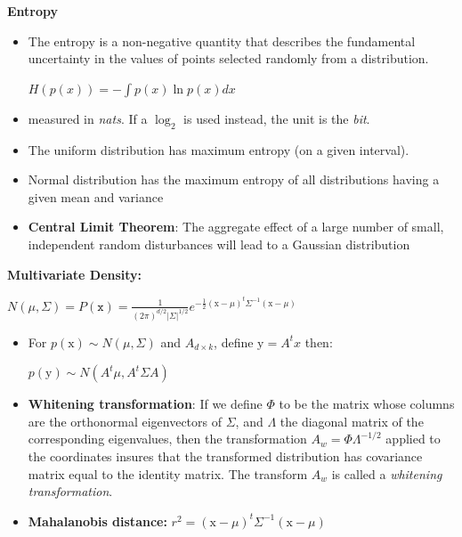 \documentclass{../cheat}
\begin{document}
\begin{multicols}{3}
	\textbf{Entropy}
	\begin{itemize}[nolistsep, leftmargin=1em]
		\item The entropy is a non-negative quantity that describes the fundamental uncertainty in the values of points selected randomly from a distribution.\\
			\centerline{$H(p(x)) = - \int {p(x) \ln p(x)dx}$}
		\item measured in \textit{nats}. If a $\log_2$ is used instead, the unit is the \textit{bit}.
		\item The uniform distribution has maximum entropy (on a given interval).
		\item Normal distribution has the maximum entropy of all distributions having a given mean and variance
		\item \textbf{Central Limit Theorem}: The aggregate effect of a large number of small, independent random disturbances will lead to a Gaussian distribution
	\end{itemize}
	
	\textbf{Multivariate Density:}\\
	\centerline{$N(\mu, \Sigma)=P(\mathtt{x})=\frac{1}{(2\pi)^{d/2}\vert\Sigma\vert^{1/2}}e^{-\frac{1}{2}(\mathrm{x}-\mu)^t\Sigma^{-1}(\mathrm{x}-\mu)}$}

	\begin{itemize}[nolistsep, leftmargin=1em]
		\item For $p(\mathrm{x}) \sim N(\mu,\Sigma)$ and $A_{d\times k}$, define $\mathrm{y} = A^t x$ then:\\
			\centerline{ $p(\mathrm{y}) \sim N(A^t\mu,A^t \Sigma A)$}
		\item \textbf{Whitening transformation}: If we define $\Phi$ to be the matrix whose columns are the orthonormal eigenvectors of $\Sigma$, and $\Lambda$ the diagonal matrix of the corresponding eigenvalues, then the transformation $A_w = \Phi\Lambda^{-1/2}$ applied to the coordinates insures that the transformed distribution has covariance matrix equal to the identity matrix.
	The transform $A_w$ is called a \textit{whitening transformation}.	
		\item \textbf{Mahalanobis distance:} $r^2=(\mathrm{x}-\mu)^t\Sigma^{-1}(\mathrm{x}-\mu)$
	\end{itemize}
	

\end{multicols}
\end{document}

